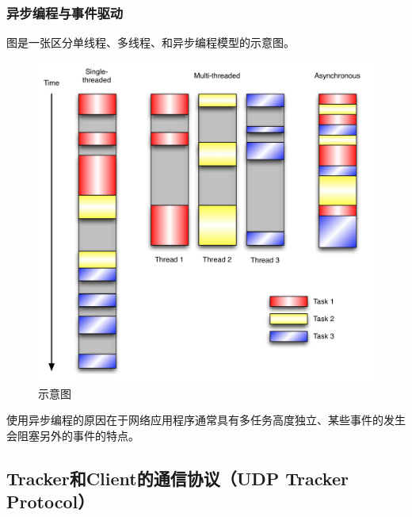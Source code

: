 \documentclass[15pt]{ctexart}
\begin{document}
		\subsubsection{异步编程与事件驱动} %
		\label{ssub:异步编程与事件驱动}
			图是一张区分单线程、多线程、和异步编程模型的示意图。
		\begin{figure}[H]
			\centering
			\includegraphics[scale=0.4]{imgs/threading_models.png}
			\caption{示意图}
			\label{fig:threading_models}
		\end{figure}
			\par 使用异步编程的原因在于网络应用程序通常具有多任务高度独立、某些事件的发生会阻塞另外的事件的特点。

	\subsection{Tracker和Client的通信协议（UDP Tracker Protocol）} %
	\label{sub:tracker_和_client}
\end{document}
